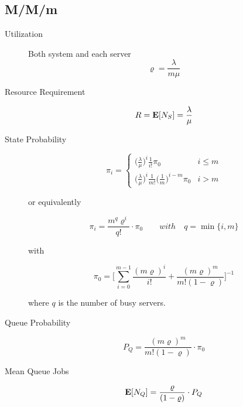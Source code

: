 \subsection{M/M/m}

\begin{description}
	
	\item [Utilization]
	Both system and each server
		\begin{equation}
		\varrho = \frac{\lambda}{m\mu}
		\end{equation}
		
	\item [Resource Requirement]	
		\begin{equation}	
		R = \mathbf{E}[N_{S}] = \frac{\lambda}{\mu}
		\end{equation}
	
	\item [State Probability]
		\begin{equation}
		\pi_{i} = \left\{\begin{matrix}
		\Big(\frac{\lambda}{\mu}\Big)^{i}\frac{1}{i!}\pi_{0} & i \leq m\\ 
		\Big(\frac{\lambda}{\mu}\Big)^{i}\frac{1}{m!}\Big(\frac{1}{m}\Big)^{i-m}\pi_{0} & i > m
		\end{matrix}\right.
		\end{equation}
		
		or equivalently
	
		\begin{equation}
		\pi_{i} = \frac{m^{q} \varrho^{i}}{q!} \cdot \pi_{0} \qquad with \quad q=\min\{i,m\}
		\end{equation}
		
		with
		
		\begin{equation}	
		\pi_{0} = \Big[ \sum_{i=0}^{m-1} \frac{(m \varrho)^{i}}{i!} + \frac{(m \varrho)^{m}}{m! (1- \varrho)} \Big]^{-1}
		\end{equation}
		
		where $q$ is the number of busy servers.	
	
	\item [Queue Probability]
		\begin{equation}
		P_{Q} = \frac{(m \varrho)^{m}}{m!(1-\varrho)} \cdot \pi_{0}
		\end{equation}
		
	\item [Mean Queue Jobs]
		\begin{equation}
		\mathbf{E}[N_{Q}] = \frac{\varrho}{(1-\varrho)} \cdot P_{Q}
		\end{equation}
	
\end{description}




